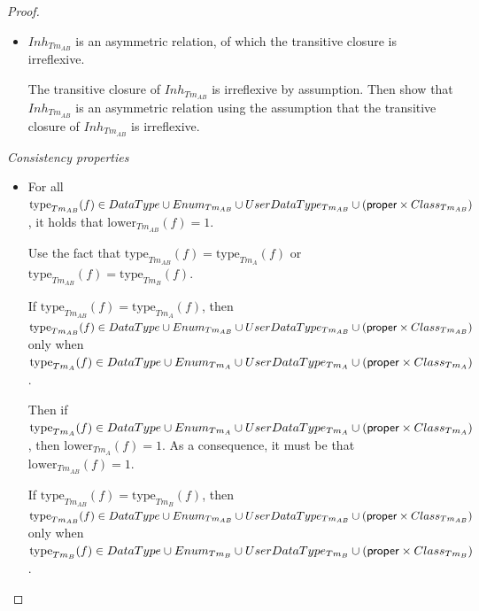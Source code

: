 \begin{proof}
\begin{itemize}
    It is not possible to directly proof the cases where the identifier comes from $Class_{Tm_{A}} \cup Enum_{Tm_{A}} \cup UserDataType_{Tm_{A}}$ and the namespace comes from $Class_{Tm_{B}} \cup Enum_{Tm_{B}} \cup UserDataType_{Tm_{B}}$. Furthermore, it is also not possible for the cases where the identifier comes from $Class_{Tm_{B}} \cup Enum_{Tm_{B}} \cup UserDataType_{Tm_{B}}$ and the namespace comes from\\ $Class_{Tm_{A}} \cup Enum_{Tm_{A}} \cup UserDataType_{Tm_{A}}$. For these cases, the proof follows from the assumptions.
    
    
    \item $Inh_{Tm_{AB}}$ is an asymmetric relation, of which the transitive closure is irreflexive.
    
    The transitive closure of $Inh_{Tm_{AB}}$ is irreflexive by assumption. Then show that $Inh_{Tm_{AB}}$ is an asymmetric relation using the assumption that the transitive closure of $Inh_{Tm_{AB}}$ is irreflexive.
\end{itemize}

\emph{Consistency properties}
\begin{itemize}
    \item For all $\mathrm{type}_{Tm_{AB}}(f) \in DataType \cup Enum_{Tm_{AB}} \cup UserDataType_{Tm_{AB}} \cup (\mathsf{proper} \times Class_{Tm_{AB}})$, it holds that $\mathrm{lower}_{Tm_{AB}}(f) = 1$.
    
    Use the fact that $\mathrm{type}_{Tm_{AB}}(f) = \mathrm{type}_{Tm_{A}}(f)$ or $\mathrm{type}_{Tm_{AB}}(f) = \mathrm{type}_{Tm_{B}}(f)$.
    
    If $\mathrm{type}_{Tm_{AB}}(f) = \mathrm{type}_{Tm_{A}}(f)$, then $\mathrm{type}_{Tm_{AB}}(f) \in DataType \cup Enum_{Tm_{AB}} \cup UserDataType_{Tm_{AB}} \cup (\mathsf{proper} \times Class_{Tm_{AB}})$ only when $\mathrm{type}_{Tm_{A}}(f) \in DataType \cup Enum_{Tm_{A}} \cup UserDataType_{Tm_{A}} \cup (\mathsf{proper} \times Class_{Tm_{A}})$.
    
    Then if $\mathrm{type}_{Tm_{A}}(f) \in DataType \cup Enum_{Tm_{A}} \cup UserDataType_{Tm_{A}} \cup (\mathsf{proper} \times Class_{Tm_{A}})$, then $\mathrm{lower}_{Tm_{A}}(f) = 1$. As a consequence, it must be that $\mathrm{lower}_{Tm_{AB}}(f) = 1$.
    
    If $\mathrm{type}_{Tm_{AB}}(f) = \mathrm{type}_{Tm_{B}}(f)$, then $\mathrm{type}_{Tm_{AB}}(f) \in DataType \cup Enum_{Tm_{AB}} \cup UserDataType_{Tm_{AB}} \cup (\mathsf{proper} \times Class_{Tm_{AB}})$ only when $\mathrm{type}_{Tm_{B}}(f) \in DataType \cup Enum_{Tm_{B}} \cup UserDataType_{Tm_{B}} \cup (\mathsf{proper} \times Class_{Tm_{B}})$.
    

\end{itemize}
\end{proof}
